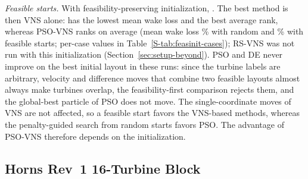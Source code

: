 \emph{Feasible starts.} With feasibility-preserving initialization, \NFeasInitPhrase. The best method is then VNS alone: \NFbFeasBestLoss{} has the lowest mean wake loss and \NFbFeasBestRank{} the best average rank, whereas PSO-VNS ranks \NFbFeasRankPSOVNS{} on average (mean wake loss \NFbRandLossPSOVNS\% with random and \NFbFeasLossPSOVNS\% with feasible starts; per-case values in Table~\ref{S-tab:feasinit-cases}); RS-VNS was not run with this initialization (Section~\ref{sec:setup-beyond}). PSO and DE never improve on the best initial layout in these runs: since the turbine labels are arbitrary, velocity and difference moves that combine two feasible layouts almost always make turbines overlap, the feasibility-first comparison rejects them, and the global-best particle of PSO does not move. The single-coordinate moves of VNS are not affected, so a feasible start favors the VNS-based methods, whereas the penalty-guided search from random starts favors PSO. The advantage of PSO-VNS therefore depends on the initialization.

\subsection{Horns Rev~1 16-Turbine Block}
\label{sec:hornsrev-site}


